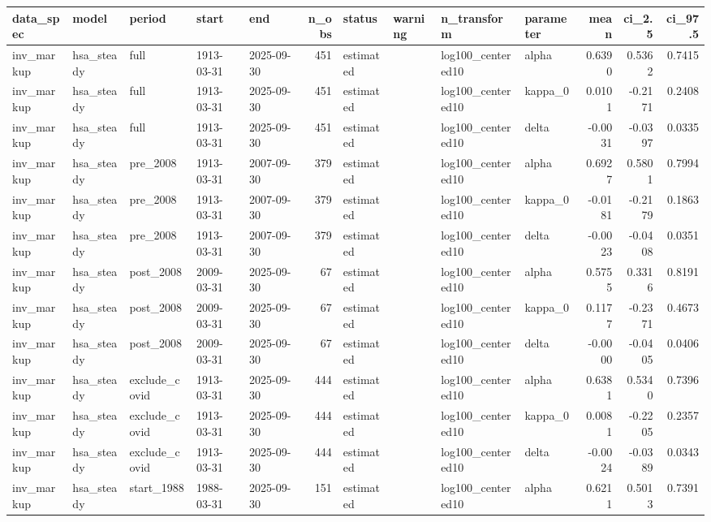 \begin{tabular}{lllllrllllrrr}
\toprule
data\_spec & model & period & start & end & n\_obs & status & warning & n\_transform & parameter & mean & ci\_2.5 & ci\_97.5 \\
\midrule
inv\_markup & hsa\_steady & full & 1913-03-31 & 2025-09-30 & 451 & estimated &  & log100\_centered10 & alpha & 0.6390 & 0.5362 & 0.7415 \\
inv\_markup & hsa\_steady & full & 1913-03-31 & 2025-09-30 & 451 & estimated &  & log100\_centered10 & kappa\_0 & 0.0101 & -0.2171 & 0.2408 \\
inv\_markup & hsa\_steady & full & 1913-03-31 & 2025-09-30 & 451 & estimated &  & log100\_centered10 & delta & -0.0031 & -0.0397 & 0.0335 \\
inv\_markup & hsa\_steady & pre\_2008 & 1913-03-31 & 2007-09-30 & 379 & estimated &  & log100\_centered10 & alpha & 0.6927 & 0.5801 & 0.7994 \\
inv\_markup & hsa\_steady & pre\_2008 & 1913-03-31 & 2007-09-30 & 379 & estimated &  & log100\_centered10 & kappa\_0 & -0.0181 & -0.2179 & 0.1863 \\
inv\_markup & hsa\_steady & pre\_2008 & 1913-03-31 & 2007-09-30 & 379 & estimated &  & log100\_centered10 & delta & -0.0023 & -0.0408 & 0.0351 \\
inv\_markup & hsa\_steady & post\_2008 & 2009-03-31 & 2025-09-30 & 67 & estimated &  & log100\_centered10 & alpha & 0.5755 & 0.3316 & 0.8191 \\
inv\_markup & hsa\_steady & post\_2008 & 2009-03-31 & 2025-09-30 & 67 & estimated &  & log100\_centered10 & kappa\_0 & 0.1177 & -0.2371 & 0.4673 \\
inv\_markup & hsa\_steady & post\_2008 & 2009-03-31 & 2025-09-30 & 67 & estimated &  & log100\_centered10 & delta & -0.0000 & -0.0405 & 0.0406 \\
inv\_markup & hsa\_steady & exclude\_covid & 1913-03-31 & 2025-09-30 & 444 & estimated &  & log100\_centered10 & alpha & 0.6381 & 0.5340 & 0.7396 \\
inv\_markup & hsa\_steady & exclude\_covid & 1913-03-31 & 2025-09-30 & 444 & estimated &  & log100\_centered10 & kappa\_0 & 0.0081 & -0.2205 & 0.2357 \\
inv\_markup & hsa\_steady & exclude\_covid & 1913-03-31 & 2025-09-30 & 444 & estimated &  & log100\_centered10 & delta & -0.0024 & -0.0389 & 0.0343 \\
inv\_markup & hsa\_steady & start\_1988 & 1988-03-31 & 2025-09-30 & 151 & estimated &  & log100\_centered10 & alpha & 0.6211 & 0.5013 & 0.7391 \\

\end{tabular}
